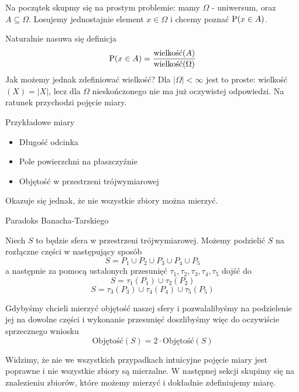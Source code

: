 Na początek skupmy się na prostym problemie: mamy \(\Omega\) - uniwersum, oraz \(A \subseteq \Omega\). Losujemy jednostajnie element \(x \in \Omega\) i chcemy poznać \(\operatorname{P}(x \in A)\).

Naturalnie nasuwa się definicja
\[
	\operatorname{P}(x \in A) = \frac{\text{wielkość}(A)}{\text{wielkość}(\Omega)}
\]
Jak możemy jednak zdefiniować wielkość? Dla \(|\Omega| < \infty\) jest to proste: wielkość\((X) = |X|\), lecz dla \(\Omega\) nieskończonego nie ma już oczywistej odpowiedzi. Na ratunek przychodzi pojęcie miary.

\begin{example} Przykładowe miary
	\begin{itemize}
		\item Długość odcinka
		\item Pole powierzchni na płaszczyźnie
		\item Objętość w przestrzeni trójwymiarowej
	\end{itemize}
\end{example}

Okazuje się jednak, że nie wszystkie zbiory można mierzyć.
\begin{example}
	Paradoks Banacha-Tarskiego
	
	Niech \(S\) to będzie sfera w przestrzeni trójwymiarowej. Możemy podzielić \(S\) na rozłączne części w następujący sposób
	\[
		S = P_1 \cup P_2 \cup P_3 \cup P_4 \cup P_5
	\]
	a następnie za pomocą ustalonych przesunięć \(\tau_1, \tau_2, \tau_3, \tau_4, \tau_5\) dojść do
	\[
		S = \tau_1(P_1) \cup \tau_2(P_2)
	\]
	\[
		S = \tau_3(P_3) \cup \tau_4(P_4) \cup \tau_5(P_5)
	\]
	
	Gdybyśmy chcieli mierzyć objętość naszej sfery i pozwalalibyśmy na podzielenie jej na dowolne części i wykonanie przesunięć doszlibyśmy więc do oczywiście sprzecznego wniosku
	\[
		\text{Objętość}(S) = 2 \cdot \text{Objętość}(S) 
	\]
\end{example}

Widzimy, że nie we wszystkich przypadkach intuicyjne pojęcie miary jest poprawne i nie wszystkie zbiory są mierzalne. W następnej sekcji skupimy się na znalezieniu zbiorów, które możemy mierzyć i dokładnie zdefiniujemy miarę.